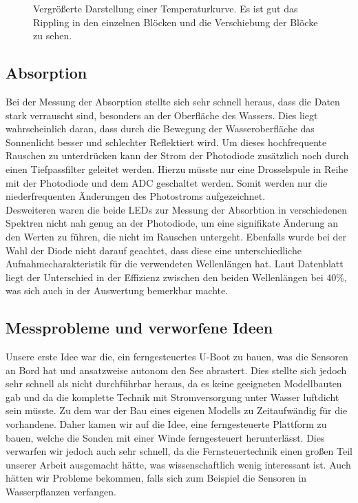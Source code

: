 \documentclass[12pt,a4paper,titlepage,headinclude,bibtotoc]{scrartcl}
\numberwithin{equation}{subsection}
\begin{document}
\begin{figure}[h]
	\centering
	
	\caption{Vergrößerte Darstellung einer Temperaturkurve. Es ist gut das Rippling in den einzelnen Blöcken und die Verschiebung der Blöcke zu sehen.}
	\label{fig:tempSprung}
\end{figure}

\subsection{Absorption}
Bei der Messung der Absorption stellte sich sehr schnell heraus, dass die Daten stark verrauscht sind, besonders an der Oberfläche des Wassers.
Dies liegt wahrscheinlich daran, dass durch die Bewegung der Wasseroberfläche das Sonnenlicht besser und schlechter Reflektiert wird.
Um dieses hochfrequente Rauschen zu unterdrücken kann der Strom der Photodiode zusätzlich noch durch einen Tiefpassfilter geleitet werden.
Hierzu müsste nur eine Drosselspule in Reihe mit der Photodiode und dem ADC geschaltet werden.
Somit werden nur die niederfrequenten Änderungen des Photostroms aufgezeichnet.\\
Desweiteren waren die beide LEDs zur Messung der Absorbtion in verschiedenen Spektren nicht nah genug an der Photodiode, um eine signifikate Änderung an den Werten zu führen, die nicht im Rauschen untergeht.
Ebenfalls wurde bei der Wahl der Diode nicht darauf geachtet, dass diese eine unterschiedliche Aufnahmecharakteristik für die verwendeten Wellenlängen hat.
Laut Datenblatt liegt der Unterschied in der Effizienz zwischen den beiden Wellenlängen bei 40\%, was sich auch in der Auswertung bemerkbar machte. %


\subsection{Messprobleme und verworfene Ideen}
Unsere erste Idee war die, ein ferngesteuertes U-Boot zu bauen, was die Sensoren an Bord hat und ansatzweise autonom den See abrastert.
Dies stellte sich jedoch sehr schnell als nicht durchführbar heraus, da es keine geeigneten Modellbauten gab und da die komplette Technik mit Stromversorgung unter Wasser luftdicht sein müsste.
Zu dem war der Bau eines eigenen Modells zu Zeitaufwändig für die vorhandene.
Daher kamen wir auf die Idee, eine ferngesteuerte Plattform zu bauen, welche die Sonden mit einer Winde ferngesteuert herunterlässt.
Dies verwarfen wir jedoch auch sehr schnell, da die Fernsteuertechnik einen großen Teil unserer Arbeit ausgemacht hätte, was wissenschaftlich wenig interessant ist.
Auch hätten wir Probleme bekommen, falls sich zum Beispiel die Sensoren in Wasserpflanzen verfangen.
\end{document}
